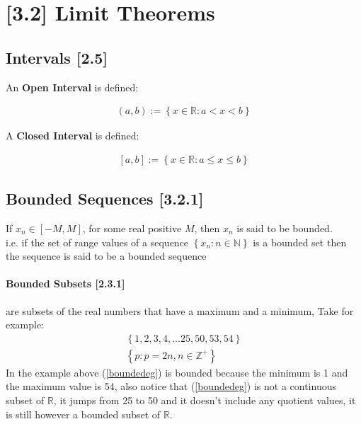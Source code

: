\documentclass[class=article, crop=false]{standalone}
\begin{document}
\section{[3.2] Limit Theorems}
\subsection{Intervals [2.5]}

An \textbf{Open Interval} is defined:

\begin{align}
  \left( a,b \right) := \left\{ x \in \mathbb{R} : a<x<b \right\}
  \label{openintdef}
\end{align}

A \textbf{Closed Interval} is defined:

\begin{align}
  \left[ a,b \right] := \left\{ x \in \mathbb{R} : a\leq x\leq b \right\}
  \label{closedintdef}
\end{align}

\subsection{Bounded Sequences [3.2.1]}

If $x_{n} \in \left[ -M, M \right]$, for some real positive $M$,  then $x_{n}$ is said to be bounded. \\

{\small i.e. if the set of range values of a sequence $\left\{ x_{n} : n \in \mathbb{N} \right\}$ is a bounded set then the sequence is said to be a bounded sequence}

\paragraph{Bounded Subsets [2.3.1]} are subsets of the real numbers that have a maximum and a minimum, Take for example:
\begin{align}
  \left\{ 1, 2, 3, 4, \dots 25, 50, 53, 54  \right\}
  \label{boundedeg} \\
  \left\{ p : p = 2n, n \in \mathbb{Z^+} \right\} 
  \label{notbounded}
\end{align}
In the example above (\ref{boundedeg}) is bounded because the minimum is 1 and the maximum value is 54, also notice that (\ref{boundedeg}) is not a continuous subset of $\mathbb{R}$, it jumps from 25 to 50 and it doesn't include any quotient values, it is still however a bounded subset of $\mathbb{R}$. 
\end{document}
